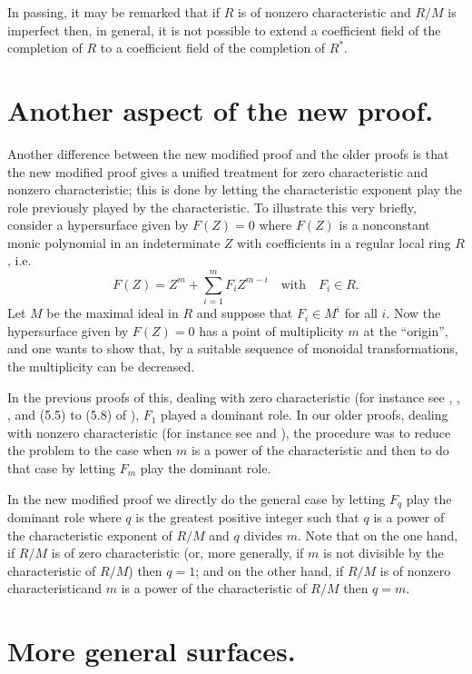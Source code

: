 In passing, it may be remarked that if $R$ is of nonzero characteristic and $R/M$ is imperfect then, in general, it is not possible to extend a coefficient field of the completion of $R$ to a coefficient field of the completion of $R^{*}$.

\section{Another aspect of the new proof.}\label{art01-sec4}

\smallskip

Another difference between the new modified proof and the older proofs is that the new modified proof gives a unified treatment for zero characteristic and nonzero characteristic; this is done by letting the characteristic exponent play the role previously played by the characteristic. To illustrate this very briefly, consider a hypersurface given by $F(Z)=0$ where $F(Z)$ is a nonconstant monic polynomial in an indeterminate $Z$ with coefficients in a regular local ring $R$, i.e.
$$
F(Z)=Z^{m}+\sum\limits^{m}_{i=1}F_{i}Z^{m-i}\quad\text{with}\quad F_{i}\in R.
$$
Let $M$ be the maximal ideal in $R$ and suppose that $F_{i}\in M^{i}$ for all $i$. Now the hypersurface given by $F(Z)=0$ has a point of multiplicity $m$ at the ``origin'', and one wants to show that, by a suitable sequence of monoidal transformations, the multiplicity can be decreased.

In the previous proofs of this, dealing with zero characteristic (for instance see \cite{art01-key16}, \cite{art01-key18}, \cite{art01-key12}, and (5.5) to (5.8) of \cite{art01-key10}), $F_{1}$ played a dominant role. In our older proofs, dealing with nonzero characteristic (for instance see \cite{art01-key9} and \cite{art01-key11}), the procedure was to reduce the problem to the case when $m$ is a power of the characteristic and then to do that case by letting $F_{m}$ play the dominant role.

In the new modified proof we directly do the general case by letting $F_{q}$ play the dominant role where $q$ is the greatest positive integer such that $q$ is a power of the characteristic exponent of $R/M$ and $q$ divides $m$. Note that on the one hand, if $R/M$ is of zero characteristic (or, more generally, if $m$ is not divisible by the characteristic of $R/M$) then $q=1$; and on the other hand, if $R/M$ is of nonzero characteristic\pageoriginale and $m$ is a power of the characteristic of $R/M$ then $q=m$.

\section{More general surfaces.}\label{art01-sec5}

